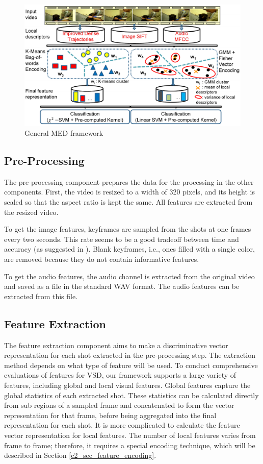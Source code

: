 \begin{figure}
	\centering
	\includegraphics[width=1\textwidth]{framework.pdf}
	\caption{General MED framework}
	\label{med_framework}
\end{figure}

\subsection{Pre-Processing}

The pre-processing component prepares the data for the processing in the other components. First, the video is resized to a width of 320 pixels, and its height is scaled so that the aspect ratio is kept the same. All features are extracted from the resized video. 

To get the image features, keyframes are sampled from the shots at one frames every two seconds. This rate seems to be a good tradeoff between time and accuracy (as suggested in \cite{trecvid10:cuucf}). Blank keyframes, i.e., ones filled with a single color, are removed because they do not contain informative features.

To get the audio features, the audio channel is extracted from the original video and saved as a file in the standard WAV format. The audio features can be extracted from this file.

\subsection{Feature Extraction}

The feature extraction component aims to make a discriminative vector representation for each shot extracted in the pre-processing step. The extraction method depends on what type of feature will be used. To conduct comprehensive evaluations of features for VSD, our framework supports a large variety of features, including global and local visual features. Global features capture the global statistics of each extracted shot. These statistics can be calculated directly from sub regions of a sampled frame and concatenated to form the vector representation for that frame, before being aggregated into the final representation for each shot. It is more complicated to calculate the feature vector representation for local features. The number of local features varies from frame to frame; therefore, it requires a special encoding technique, which will be described in Section \ref{c2_sec_feature_encoding}.

